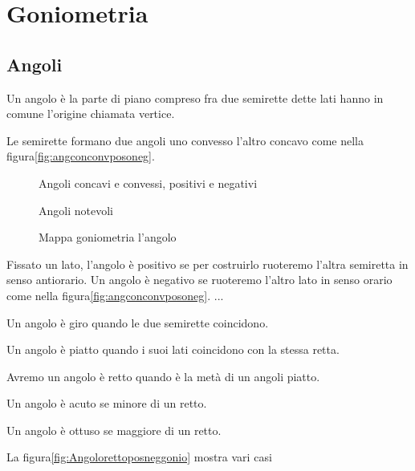 \chapter{Goniometria}
\label{sec:GONIOMETRIA}
\section{Angoli}
\label{sec:gonioang}
\begin{definizione}[Angolo]
Un angolo è la parte di piano compreso fra due semirette dette lati hanno in comune l'origine chiamata vertice.
\end{definizione}

Le  semirette formano due angoli  uno convesso l'altro concavo come nella figura\nobs\vref{fig:angconconvposoneg}. 
\begin{figure} %
	\centering

	\caption{Angoli concavi e convessi, positivi e negativi}
	\label{fig:angconconvposoneg}
\end{figure}
\begin{figure} %
	\centering

	\caption{Angoli notevoli}
	\label{fig:Angolorettoposneggonio}
\end{figure}
\begin{figure}

	\caption{Mappa goniometria l'angolo}
	\label{fig:MappaGonometria1}
\end{figure}
\begin{definizione}
	Fissato un lato, l'angolo è  positivo  se per costruirlo ruoteremo l'altra semiretta in senso antiorario.  Un angolo è negativo se ruoteremo l'altro lato in senso orario come nella figura\nobs\vref{fig:angconconvposoneg}. ...
\end{definizione}
\begin{definizione}
Un angolo è giro quando le due semirette coincidono. 
\end{definizione}
\begin{definizione}
Un angolo è  piatto quando i suoi lati  coincidono con la stessa retta.
\end{definizione}
\begin{definizione}
Avremo un angolo è retto quando è la metà di un angoli piatto. 
\end{definizione}
\begin{definizione}
Un angolo è acuto se  minore di un  retto.
\end{definizione}
\begin{definizione}
Un angolo è ottuso se  maggiore di un  retto.
\end{definizione}
 La figura\nobs\vref{fig:Angolorettoposneggonio} mostra  vari casi

